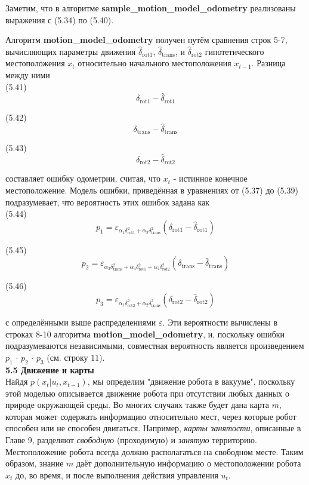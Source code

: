\documentclass[10pt,a4paper]{article}
\begin{document}
Заметим, что в алгоритме \textbf{sample\_motion\_model\_odometry} реализованы выражения с (5.34) по (5.40).

Алгоритм \textbf{motion\_model\_odometry} получен путём сравнения строк 5-7, вычисляющих параметры движения $\hat{\delta}_{\text{rot}1}$, $\hat{\delta}_{\text{trans}}$, и $\hat{\delta}_{\text{rot}2}$ гипотетического местоположения $x_t$ относительно начального местоположения $x_{t-1}$. Разница между ними\\

(5.41)
$$\delta_{\text{rot}1}-\hat{\delta}_{\text{rot}1}$$

(5.42)
$$\delta_{\text{trans}}-\hat{\delta}_{\text{trans}}$$

(5.43)
$$\delta_{\text{rot}2}-\hat{\delta}_{\text{rot}2}$$

составляет ошибку одометрии, считая, что $x_t$ - истинное конечное местоположение. Модель ошибки, приведённая в уравнениях от (5.37) до (5.39) подразумевает, что вероятность этих ошибок задана как \\

(5.44)
$$p_1=\varepsilon_{\alpha_1\delta_{\text{rot}1}^2+\alpha_2\delta_{\text{trans}}^2}(\delta_{\text{rot}1}-\hat{\delta}_{\text{rot}1})$$

(5.45)
$$p_2=\varepsilon_{\alpha_3\delta_{\text{trans}}^2+\alpha_4\delta_{\text{rot}1}^2+\alpha_4\delta_{\text{rot}2}^2}(\delta_{\text{trans}}-\hat{\delta}_{\text{trans}})$$

(5.46)
$$p_3=\varepsilon_{\alpha_1\delta_{\text{rot}2}^2+\alpha_2\delta_{\text{trans}}^2}(\delta_{\text{rot}2}-\hat{\delta}_{\text{rot}2})$$

с определёнными выше распределениями $\varepsilon$. Эти вероятности вычислены в строках 8-10 алгоритма \textbf{motion\_model\_odometry}, и, поскольку ошибки подразумеваются независимыми, совместная вероятность является произведением $p_1\,\cdot\,p_2\,\cdot\,p_3$ (см. строку 11).\\

\textbf{5.5 Движение и карты}\\

Найдя $p(x_t | u_t, x_{t-1})$, мы определим "движение робота в вакууме", поскольку этой моделью описывается движение робота при отсутствии любых данных о природе окружающей среды. Во многих случаях также будет дана карта $m$, которая может содержать информацию относительно мест, через которые робот способен или не способен двигаться. Например, \textit{карты занятости}, описанные в Главе 9, разделяют \textit{свободную} (проходимую) и \textit{занятую} территорию. Местоположение робота всегда должно располагаться на свободном месте. Таким образом, знание $m$ даёт дополнительную информацию о местоположении робота $x_t$ до, во время, и после выполнения действия управления $u_t$.
\end{document}

